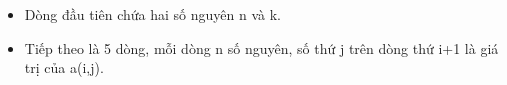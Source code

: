 \begin{itemize}
	\item Dòng đầu tiên chứa hai số nguyên n và k.
	\item Tiếp theo là 5 dòng, mỗi dòng n số nguyên, số thứ j trên dòng thứ i+1 là giá trị của a(i,j).
\end{itemize}